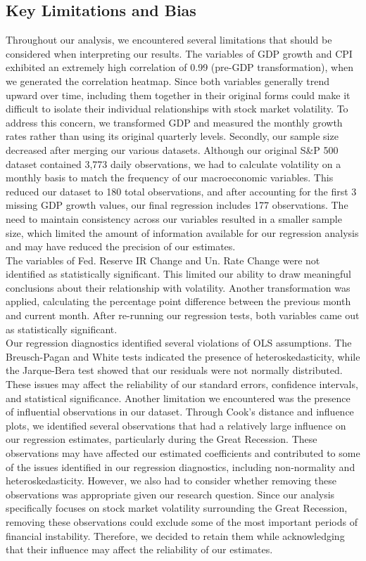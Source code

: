 \subsection{Key Limitations and Bias}
Throughout our analysis, we encountered several limitations that should be considered when interpreting our results. The variables of GDP growth and CPI exhibited an extremely high correlation of 0.99 (pre-GDP transformation), when we generated the correlation heatmap. Since both variables generally trend upward over time, including them together in their original forms could make it difficult to isolate their individual relationships with stock market volatility. To address this concern, we transformed GDP and measured the monthly growth rates rather than using its original quarterly levels. Secondly, our sample size decreased after merging our various datasets. Although our original S\&P 500 dataset contained 3,773 daily observations, we had to calculate volatility on a monthly basis to match the frequency of our macroeconomic variables. This reduced our dataset to 180 total observations, and after accounting for the first 3 missing GDP growth values, our final regression includes 177 observations. The need to maintain consistency across our variables resulted in a smaller sample size, which limited the amount of information available for our regression analysis and may have reduced the precision of our estimates.\\
\indent The variables of Fed. Reserve IR Change and Un. Rate Change were not identified as statistically significant. This limited our ability to draw meaningful conclusions about their relationship with volatility. Another transformation was applied, calculating the percentage point difference between the previous month and current month. After re-running our regression tests, both variables came out as statistically significant. \\
\indent Our regression diagnostics identified several violations of OLS assumptions. The Breusch-Pagan and White tests indicated the presence of heteroskedasticity, while the Jarque-Bera test showed that our residuals were not normally distributed. These issues may affect the reliability of our standard errors, confidence intervals, and statistical significance. Another limitation we encountered was the presence of influential observations in our dataset. Through Cook’s distance and influence plots, we identified several observations that had a relatively large influence on our regression estimates, particularly during the Great Recession. These observations may have affected our estimated coefficients and contributed to some of the issues identified in our regression diagnostics, including non-normality and heteroskedasticity. However, we also had to consider whether removing these observations was appropriate given our research question. Since our analysis specifically focuses on stock market volatility surrounding the Great Recession, removing these observations could exclude some of the most important periods of financial instability. Therefore, we decided to retain them while acknowledging that their influence may affect the reliability of our estimates. \\
